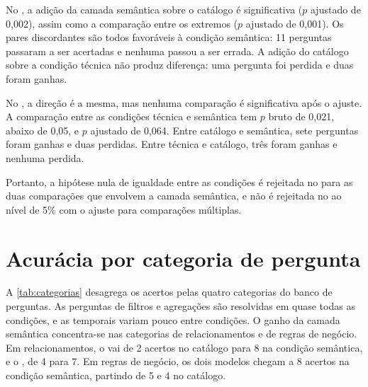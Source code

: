 No , a adição da camada semântica sobre o catálogo é
significativa ($p$ ajustado de 0,002), assim como a comparação entre os
extremos ($p$ ajustado de 0,001). Os pares discordantes são todos
favoráveis à condição semântica: 11 perguntas passaram a ser acertadas e
nenhuma passou a ser errada. A adição do catálogo sobre a condição
técnica não produz diferença: uma pergunta foi perdida e duas foram
ganhas.

No , a direção é a mesma, mas nenhuma comparação é
significativa após o ajuste. A comparação entre as condições técnica e
semântica tem $p$ bruto de 0,021, abaixo de 0,05, e $p$ ajustado de 0,064.
Entre catálogo e semântica, sete perguntas foram ganhas e duas perdidas.
Entre técnica e catálogo, três foram ganhas e nenhuma perdida.

Portanto, a hipótese nula de igualdade entre as condições é rejeitada no
 para as duas comparações que envolvem a camada semântica,
e não é rejeitada no  ao nível de 5\% com o ajuste para
comparações múltiplas.

\section{Acurácia por categoria de pergunta}
\label{sec:categorias}

A \autoref{tab:categorias} desagrega os acertos pelas quatro categorias do
banco de perguntas. As perguntas de filtros e agregações são resolvidas em
quase todas as condições, e as temporais variam pouco entre condições. O
ganho da camada semântica concentra-se nas categorias de relacionamentos e
de regras de negócio. Em relacionamentos, o  vai de 2
acertos no catálogo para 8 na condição semântica, e o
, de 4 para 7. Em regras de negócio, os dois modelos
chegam a 8 acertos na condição semântica, partindo de 5 e 4 no catálogo.

